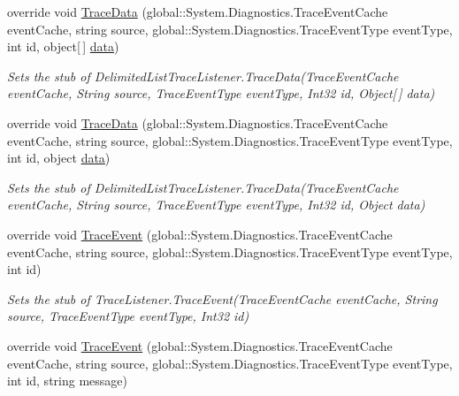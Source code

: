\begin{DoxyCompactItemize}
override void \hyperlink{class_system_1_1_diagnostics_1_1_fakes_1_1_stub_delimited_list_trace_listener_a523d263a6473cae6fc432f431fb4b7e4}{Trace\-Data} (global\-::\-System.\-Diagnostics.\-Trace\-Event\-Cache event\-Cache, string source, global\-::\-System.\-Diagnostics.\-Trace\-Event\-Type event\-Type, int id, object\mbox{[}$\,$\mbox{]} \hyperlink{jquery-1_810_82-vsdoc_8js_a609407b3456fdc3c5671a9fc4a226ff7}{data})
\begin{DoxyCompactList}\small\item\em Sets the stub of Delimited\-List\-Trace\-Listener.\-Trace\-Data(\-Trace\-Event\-Cache event\-Cache, String source, Trace\-Event\-Type event\-Type, Int32 id, Object\mbox{[}$\,$\mbox{]} data)\end{DoxyCompactList}\item 
override void \hyperlink{class_system_1_1_diagnostics_1_1_fakes_1_1_stub_delimited_list_trace_listener_af3f27601b067340539cdfae41813aa5e}{Trace\-Data} (global\-::\-System.\-Diagnostics.\-Trace\-Event\-Cache event\-Cache, string source, global\-::\-System.\-Diagnostics.\-Trace\-Event\-Type event\-Type, int id, object \hyperlink{jquery-1_810_82-vsdoc_8js_a609407b3456fdc3c5671a9fc4a226ff7}{data})
\begin{DoxyCompactList}\small\item\em Sets the stub of Delimited\-List\-Trace\-Listener.\-Trace\-Data(\-Trace\-Event\-Cache event\-Cache, String source, Trace\-Event\-Type event\-Type, Int32 id, Object data)\end{DoxyCompactList}\item 
override void \hyperlink{class_system_1_1_diagnostics_1_1_fakes_1_1_stub_delimited_list_trace_listener_af30eb3771decac1d24c37fb06d754583}{Trace\-Event} (global\-::\-System.\-Diagnostics.\-Trace\-Event\-Cache event\-Cache, string source, global\-::\-System.\-Diagnostics.\-Trace\-Event\-Type event\-Type, int id)
\begin{DoxyCompactList}\small\item\em Sets the stub of Trace\-Listener.\-Trace\-Event(\-Trace\-Event\-Cache event\-Cache, String source, Trace\-Event\-Type event\-Type, Int32 id)\end{DoxyCompactList}\item 
override void \hyperlink{class_system_1_1_diagnostics_1_1_fakes_1_1_stub_delimited_list_trace_listener_afb54e9713d70f64bdcb50c3f5d544846}{Trace\-Event} (global\-::\-System.\-Diagnostics.\-Trace\-Event\-Cache event\-Cache, string source, global\-::\-System.\-Diagnostics.\-Trace\-Event\-Type event\-Type, int id, string message)

\end{DoxyCompactItemize}
